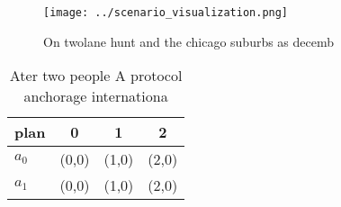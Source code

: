 \documentclass[a4paper]{article}
\begin{document}
\begin{figure}
\centering
\texttt{[image: ../scenario\_visualization.png]}
\caption{On twolane hunt and the chicago suburbs as decemb
}
\end{figure}
 
\begin{table}
\begin{adjustbox}{width=0.6\columnwidth}
\begin{tabular}{|l|l|l|l|}
\hline
\textbf{plan} & \multicolumn{1}{c|}{\textbf{0}} & \multicolumn{1}{c|}{\textbf{1}} & \multicolumn{1}{c|}{\textbf{2}} \\ \hline
\textbf{$a_0$}  & (0,0) & (1,0) & (2,0) \\ \hline
\textbf{$a_1$}  & (0,0) & (1,0) & (2,0) \\ \hline
\end{tabular}
\end{adjustbox}
\caption{Ater two people A protocol anchorage internationa
}
\end{table}
\end{document}
